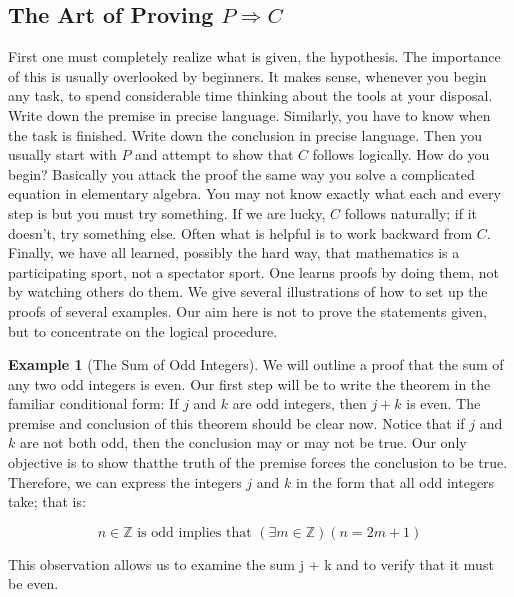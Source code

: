 \documentclass[10pt,]{book}
\theoremstyle{plain}
\theoremstyle{definition}
\theoremstyle{definition}
\theoremstyle{definition}
\newtheorem{example}[theorem]{Example}
\theoremstyle{definition}
\begin{document}
\subsection[The Art of Proving \(P \Rightarrow  C\)]{The Art of Proving \(P \Rightarrow  C\)}\label{ss-art-of-proving-ifpthenq}
First one must completely realize what is given, the hypothesis. The importance of this is usually overlooked by beginners. It makes sense, whenever you begin any task, to spend considerable time thinking about the tools at your disposal. Write down the premise in precise language. Similarly, you have to know when the task is finished. Write down the conclusion in precise language. Then you usually start with \(P\) and attempt to show that \(C\) follows logically. How do you begin? Basically you attack the proof the same way you solve a complicated equation in elementary algebra. You may not know exactly what each and every step is but you must try something. If we are lucky, \(C\) follows naturally; if it doesn't, try something else. Often what is helpful is to work backward from \(C\). Finally, we have all learned, possibly the hard way,
that mathematics is a participating sport, not a spectator sport. One learns proofs by doing them, not by watching others do them. We give several illustrations of how to set up the proofs of several examples. Our aim here is not to prove the statements given, but to concentrate on the logical procedure.%
\begin{example}[The Sum of Odd Integers]\label{ex-sumsofodds}
 We will outline a proof that the sum of any two odd integers is even. Our first step will be to write the theorem in the familiar conditional form: If \(j\) and \(k\) are odd integers, then \(j + k\) is even. The premise and conclusion of this theorem should be clear
now. Notice that if \(j\) and \(k\) are not both odd, then the conclusion may or may not be true. Our only objective is to show thatthe truth of the premise forces the conclusion to be true. Therefore, we can express the integers \(j\) and \(k\) in the form that all odd integers take; that is:

\begin{equation*}n \in  \mathbb{Z} \textrm{ is odd implies that } (\exists m\in \mathbb{Z}) (n = 2m + 1)\end{equation*}

This observation allows us to examine the sum  j + k and to verify that it must be even.%
\end{example}
\end{document}
